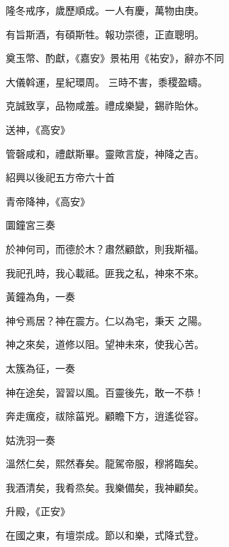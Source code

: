 \begin{pinyinscope}
 隆冬戒序，歲歷順成。一人有慶，萬物由庚。



 有旨斯酒，有碩斯牲。報功崇德，正直聰明。



 奠玉幣、酌獻，《嘉安》景祐用《祐安》，辭亦不同



 大儀斡運，星紀環周。
 三時不害，黍稷盈疇。



 克誠致享，品物咸羞。禮成樂變，錫祚貽休。



 送神，《高安》



 管磬咸和，禮獻斯畢。靈歟言旋，神降之吉。



 紹興以後祀五方帝六十首



 青帝降神，《高安》



 圜鐘宮三奏



 於神何司，而德於木？肅然顧歆，則我斯福。



 我祀孔時，我心載祗。匪我之私，神來不來。



 黃鐘為角，一奏



 神兮焉居？神在震方。仁以為宅，秉天
 之陽。



 神之來矣，道修以阻。望神未來，使我心苦。



 太簇為征，一奏



 神在途矣，習習以風。百靈後先，敢一不恭！



 奔走癘疫，祓除菑兇。顧瞻下方，逍遙從容。



 姑洗羽一奏



 溫然仁矣，熙然春矣。龍駕帝服，穆將臨矣。



 我酒清矣，我肴烝矣。我樂備矣，我神顧矣。



 升殿，《正安》



 在國之東，有壇崇成。節以和樂，式降式登。




\end{pinyinscope}
